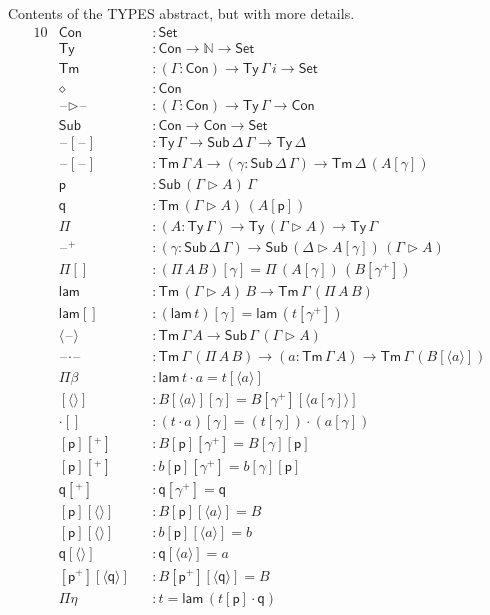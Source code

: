 \documentclass[sigplan,10pt,anonymous,review]{acmart}\settopmatter{printfolios=true,printccs=false,printacmref=false}
\newcommand{\ra}{\rightarrow}
\newcommand{\Set}{\mathsf{Set}}
\newcommand{\Ty}{\mathsf{Ty}}
\newcommand{\Tm}{\mathsf{Tm}}
\newcommand{\Con}{\mathsf{Con}}
\newcommand{\Sub}{\mathsf{Sub}}
\newcommand{\p}{\mathsf{p}}
\newcommand{\q}{\mathsf{q}}
\newcommand{\ext}{\mathop{\triangleright}}
\newcommand{\N}{\mathbb{N}}
\newcommand{\lam}{\mathsf{lam}}
\newcommand{\blank}{\mathord{\hspace{1pt}\text{--}\hspace{1pt}}} %
\begin{document}
Contents of the TYPES abstract, but with more details.
\begin{alignat*}{10}
& \Con && : \Set \\
& \Ty && : \Con\ra\N\ra\Set \\
& \Tm && : (\Gamma:\Con)\ra\Ty\,\Gamma\,i\ra\Set \\
& \diamond && : \Con \\
& \blank\ext\blank && : (\Gamma:\Con)\ra\Ty\,\Gamma\ra\Con \\
& \Sub && : \Con\ra\Con\ra\Set \\
& \blank[\blank] && : \Ty\,\Gamma\ra\Sub\,\Delta\,\Gamma\ra\Ty\,\Delta \\
& \blank[\blank] && : \Tm\,\Gamma\,A\ra(\gamma:\Sub\,\Delta\,\Gamma)\ra\Tm\,\Delta\,(A[\gamma]) \\
& \p && : \Sub\,(\Gamma\ext A)\,\Gamma \\
& \q && : \Tm\,(\Gamma\ext A)\,(A[\p]) \\
& \Pi && : (A:\Ty\,\Gamma)\ra\Ty\,(\Gamma\ext A)\ra\Ty\,\Gamma \\
& \blank^+ && : (\gamma:\Sub\,\Delta\,\Gamma)\ra\Sub\,(\Delta\ext A[\gamma])\,(\Gamma\ext A) \\
& \Pi[] && : (\Pi\,A\,B)[\gamma] = \Pi\,(A[\gamma])\,(B[\gamma^+]) \\
& \lam && : \Tm\,(\Gamma\ext A)\,B\ra\Tm\,\Gamma\,(\Pi\,A\,B) \\
& \lam[] && : (\lam\,t)[\gamma] = \lam\,(t[\gamma^+]) \\
& \langle\blank\rangle && : \Tm\,\Gamma\,A\ra\Sub\,\Gamma\,(\Gamma\ext A) \\
& \blank\cdot\blank && : \Tm\,\Gamma\,(\Pi\,A\,B)\ra(a:\Tm\,\Gamma\,A)\ra\Tm\,\Gamma\,(B[\langle a\rangle]) \\
& \Pi\beta && : \lam\,t\cdot a = t[\langle a\rangle] \\
& [\langle\rangle] && : B[\langle a\rangle][\gamma] = B[\gamma^+][\langle a[\gamma]\rangle] \\
& {\cdot}[] && : (t\cdot a)[\gamma] = (t[\gamma])\cdot(a[\gamma]) \\
& [\p][^+] && : B[\p][\gamma^+] = B[\gamma][\p] \\
& [\p][^+] && : b[\p][\gamma^+] = b[\gamma][\p] \\
& \q[^+] && : \q[\gamma^+] = \q \\
& [\p][\langle\rangle] && : B[\p][\langle a\rangle] = B \\
& [\p][\langle\rangle] && : b[\p ][\langle a\rangle] = b \\
& \q[\langle\rangle] && : \q[\langle a\rangle] = a \\
& [\p^+][\langle\q\rangle] && : B[\p^+][\langle\q\rangle] = B \\
& \Pi\eta && : t = \lam\,(t[\p]\cdot\q) \\
\end{alignat*}
\end{document}
